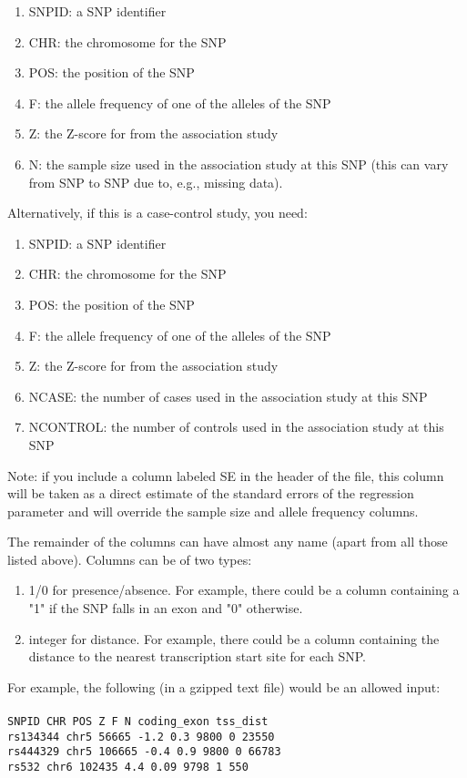 \documentclass[11pt,titlepage]{article}
\begin{document}
\begin{enumerate}
\item SNPID: a SNP identifier
\item CHR: the chromosome for the SNP
\item POS: the position of the SNP
\item F: the allele frequency of one of the alleles of the SNP
\item Z: the Z-score for from the association study
\item N: the sample size used in the association study at this SNP (this can vary from SNP to SNP due to, e.g., missing data).
\end{enumerate}

Alternatively, if this is a case-control study, you need:

\begin{enumerate}
\item SNPID: a SNP identifier
\item CHR: the chromosome for the SNP
\item POS: the position of the SNP
\item F: the allele frequency of one of the alleles of the SNP
\item Z: the Z-score for from the association study
\item NCASE: the number of cases used in the association study at this SNP
\item NCONTROL: the number of controls used in the association study at this SNP
\end{enumerate}

Note: if you include a column labeled SE in the header of the file, this column will be taken as a direct estimate of the standard errors of the regression parameter and will override the sample size and allele frequency columns. 

The remainder of the columns can have almost any name (apart from all those listed above). Columns can be of two types:

\begin{enumerate}
\item 1/0 for presence/absence. For example, there could be a column containing a "1" if the SNP falls in an exon and "0" otherwise.
\item integer for distance. For example, there could be a column containing the distance to the nearest transcription start site for each SNP.
\end{enumerate}

\noindent For example, the following (in a gzipped text file) would be an allowed input:
\\
\\
\noindent \texttt{SNPID CHR POS Z F N coding\_exon tss\_dist}\\
\texttt{rs134344 chr5 56665 -1.2 0.3 9800 0 23550}\\
\texttt{rs444329 chr5 106665 -0.4 0.9 9800 0 66783}\\
\texttt{rs532 chr6 102435 4.4 0.09 9798 1 550}
\end{document}
